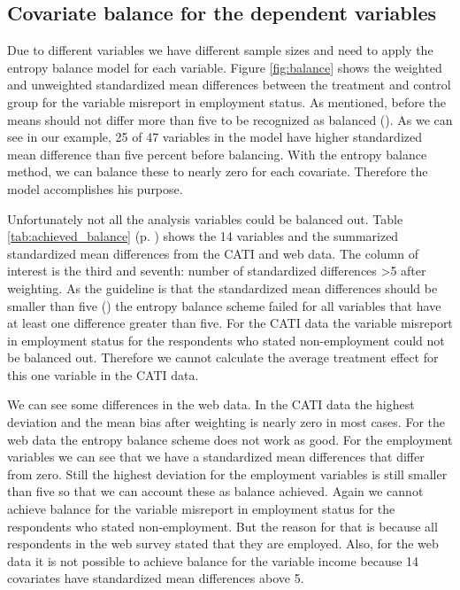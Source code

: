 \subsection{Covariate balance for the dependent variables}

Due to different variables we have different sample sizes and need to apply the entropy balance model for each variable. Figure \ref{fig:balance} shows the weighted and unweighted standardized mean differences between the treatment and control group for the variable misreport in employment status. As mentioned, before the means should not differ more than five to be recognized as balanced (\cite{Caliendoetal08}). As we can see in our example, 25 of 47 variables in the model have higher standardized mean difference than five percent before balancing. With the entropy balance method, we can balance these to nearly zero for each covariate. Therefore the model accomplishes his purpose.

Unfortunately not all the analysis variables could be balanced out. Table \ref{tab:achieved_balance} (p. \pageref{tab:achieved_balance}) shows the 14 variables and the summarized standardized mean differences from the CATI and web data. The column of interest is the third and seventh: number of standardized differences \textgreater5 after weighting. As the guideline is that the standardized mean differences should be smaller than five (\cite{Caliendoetal08}) the entropy balance scheme failed for all variables that have at least one difference greater than five. For the CATI data the variable misreport in employment status for the respondents who stated non-employment could not be balanced out. Therefore we cannot calculate the average treatment effect for this one variable in the CATI data.

We can see some differences in the web data. In the CATI data the highest deviation and the mean bias after weighting is nearly zero in most cases. For the web data the entropy balance scheme does not work as good. For the employment variables we can see that we have a standardized mean differences that differ from zero. Still the highest deviation for the employment variables is still smaller than five so that we can account these as balance achieved. Again we cannot achieve balance for the variable misreport in employment status for the respondents who stated non-employment. But the reason for that is because all respondents in the web survey stated that they are employed. Also, for the web data it is not possible to achieve balance for the variable income because 14 covariates have standardized mean differences above 5.

